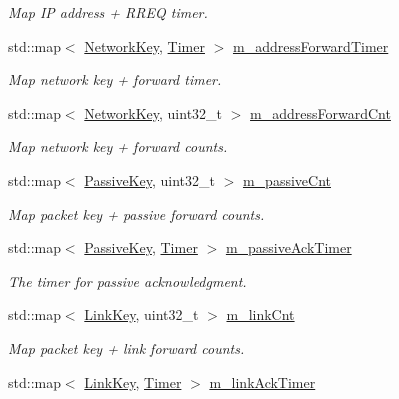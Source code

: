 \begin{DoxyCompactItemize}
\begin{DoxyCompactList}\small\item\em Map IP address + R\+R\+EQ timer. \end{DoxyCompactList}\item 
std\+::map$<$ \hyperlink{structns3_1_1dsr_1_1NetworkKey}{Network\+Key}, \hyperlink{classns3_1_1Timer}{Timer} $>$ \hyperlink{classns3_1_1dsr_1_1DsrRouting_a4a35b13cdca413ab5bc0b1b3b7b78907}{m\+\_\+address\+Forward\+Timer}
\begin{DoxyCompactList}\small\item\em Map network key + forward timer. \end{DoxyCompactList}\item 
std\+::map$<$ \hyperlink{structns3_1_1dsr_1_1NetworkKey}{Network\+Key}, uint32\+\_\+t $>$ \hyperlink{classns3_1_1dsr_1_1DsrRouting_a5042f7e5df0470025fdb6023fcc24411}{m\+\_\+address\+Forward\+Cnt}
\begin{DoxyCompactList}\small\item\em Map network key + forward counts. \end{DoxyCompactList}\item 
std\+::map$<$ \hyperlink{structns3_1_1dsr_1_1PassiveKey}{Passive\+Key}, uint32\+\_\+t $>$ \hyperlink{classns3_1_1dsr_1_1DsrRouting_a7fec404d680459aab2b40941a950502d}{m\+\_\+passive\+Cnt}
\begin{DoxyCompactList}\small\item\em Map packet key + passive forward counts. \end{DoxyCompactList}\item 
std\+::map$<$ \hyperlink{structns3_1_1dsr_1_1PassiveKey}{Passive\+Key}, \hyperlink{classns3_1_1Timer}{Timer} $>$ \hyperlink{classns3_1_1dsr_1_1DsrRouting_ac53c706898e76a7f4871a460d13edd36}{m\+\_\+passive\+Ack\+Timer}
\begin{DoxyCompactList}\small\item\em The timer for passive acknowledgment. \end{DoxyCompactList}\item 
std\+::map$<$ \hyperlink{structns3_1_1dsr_1_1LinkKey}{Link\+Key}, uint32\+\_\+t $>$ \hyperlink{classns3_1_1dsr_1_1DsrRouting_a85ba159639f9bc13b3d8890458128a79}{m\+\_\+link\+Cnt}
\begin{DoxyCompactList}\small\item\em Map packet key + link forward counts. \end{DoxyCompactList}\item 
std\+::map$<$ \hyperlink{structns3_1_1dsr_1_1LinkKey}{Link\+Key}, \hyperlink{classns3_1_1Timer}{Timer} $>$ \hyperlink{classns3_1_1dsr_1_1DsrRouting_ad532172035dbd4b038de0e94f4ce5ff6}{m\+\_\+link\+Ack\+Timer}

\end{DoxyCompactItemize}
